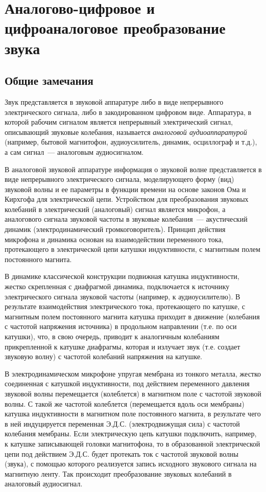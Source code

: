 \documentclass[oneside, final, 14pt]{extreport}
\begin{document}
  
\setcounter{chapter}{2}
\chapter{Аналогово-цифровое и цифроаналоговое преобразование звука}
\section{Общие замечания}

Звук представляется в звуковой аппаратуре либо в виде непрерывного электрического сигнала, либо в закодированном цифровом виде. Аппаратура, в которой рабочим сигналом является непрерывный электрический сигнал, описывающий
звуковые колебания, называется {\itshape аналоговой аудиоаппаратурой} (например, бытовой магнитофон, аудиоусилитель, динамик, осциллограф и т.д.), а сам сигнал~--- аналоговым аудиосигналом.

В аналоговой звуковой аппаратуре информация о звуковой волне представляется в виде непрерывного электрического сигнала, моделирующего форму (вид) звуковой волны и ее параметры в функции времени на основе законов Ома и Кирхгофа
для электрической цепи. Устройством для преобразования звуковых колебаний в электрический (аналоговый) сигнал является микрофон, а аналогового сигнала звуковой частоты в звуковые колебания~--- акустический динамик (электродинамический громкоговоритель). Принцип действия микрофона и динамика основан на взаимодействии переменного тока, протекающего в электрической цепи катушки индуктивности, с магнитным полем постоянного магнита.

В динамике классической конструкции подвижная катушка индуктивности, жестко скрепленная с диафрагмой динамика, подключается к источнику электрического сигнала звуковой частоты (например, к аудиоусилителю). В результате
взаимодействия электрического тока, протекающего по катушке, с магнитным полем постоянного магнита катушка приходит в движение (колебания с частотой напряжения источника) в продольном направлении (т.е. по оси катушки), что, в свою
очередь, приводит к аналогичным колебаниям прикрепленной к катушке диафрагмы, которая и излучает звук (т.е. создает звуковую волну) с частотой колебаний напряжения на катушке.

В электродинамическом микрофоне упругая мембрана из тонкого металла, жестко соединенная с катушкой индуктивности, под действием переменного давления звуковой волны перемещается (колеблется) в магнитном поле с частотой звуковой
волны. С такой же частотой колеблется (перемещается вдоль оси мембраны) катушка индуктивности в магнитном поле постоянного магнита, в результате чего в ней индуцируется переменная Э.Д.С. (электродвижущая сила) с частотой колебания мембраны. Если электрическую цепь катушки подключить, например, к катушке записывающей головки магнитофона, то в образованной электрической цепи под действием Э.Д.С. будет протекать ток с частотой звуковой волны (звука), с помощью которого реализуется запись исходного звукового сигнала на магнитную ленту. Так происходит преобразование звуковых колебаний в аналоговый аудиосигнал.
\end{document}
